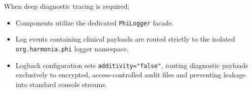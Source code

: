 When deep diagnostic tracing is required:
\begin{itemize}
    \item Components utilize the dedicated \texttt{PhiLogger} facade.
    \item Log events containing clinical payloads are routed strictly to the isolated \texttt{org.harmonia.phi} logger namespace.
    \item Logback configuration sets \texttt{additivity="false"}, routing diagnostic payloads exclusively to encrypted, access-controlled audit files and preventing leakage into standard console streams.
\end{itemize}

\newpage
